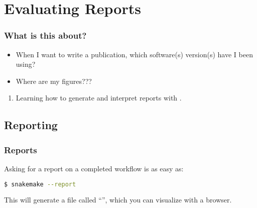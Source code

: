 \section{Evaluating Reports}
{   
}

\begin{frame}
  \frametitle{What is this about?}
   \begin{question}[Questions]
   	 \begin{itemize}
        \item When I want to write a publication, which software(s) version(s) have I been using?
        \item Where are my figures???
     \end{itemize}
   \end{question}
   \begin{docs}[Objectives]
   	  \begin{enumerate}
         \item Learning how to generate and interpret reports with \Snakemake{}.
      \end{enumerate}
  \end{docs}
\end{frame}

\subsection{Reporting}

\begin{frame}[fragile]
  \frametitle{\Snakemake{} Reports}
  Asking \Snakemake{} for a report on a completed workflow is as easy as:
  \begin{lstlisting}[language=Bash, style=Shell]
$ snakemake --report
  \end{lstlisting}
  This will generate a file called ``'', which you can visualize with a browser.
\end{frame} 


